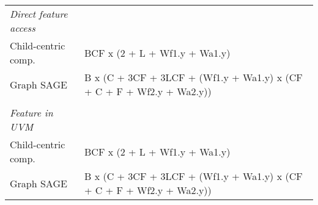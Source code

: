 \documentclass[10pt,oneside]{memoir}
\begin{document}
\begin{longtable}[]{@{}ll@{}}
\begin{minipage}[t]{0.62\columnwidth}\raggedright
\emph{Direct feature access}\strut
\end{minipage} & \begin{minipage}[t]{0.32\columnwidth}\raggedright
\strut
\end{minipage}\tabularnewline
\begin{minipage}[t]{0.62\columnwidth}\raggedright
Child-centric comp.\strut
\end{minipage} & \begin{minipage}[t]{0.32\columnwidth}\raggedright
BCF x (2 + L + Wf1.y + Wa1.y)\strut
\end{minipage}\tabularnewline
\begin{minipage}[t]{0.62\columnwidth}\raggedright
Graph SAGE\strut
\end{minipage} & \begin{minipage}[t]{0.32\columnwidth}\raggedright
B x (C + 3CF + 3LCF + (Wf1.y + Wa1.y) x (CF + C + F + Wf2.y +
Wa2.y))\strut
\end{minipage}\tabularnewline
\begin{minipage}[t]{0.62\columnwidth}\raggedright
\strut
\end{minipage} & \begin{minipage}[t]{0.32\columnwidth}\raggedright
\strut
\end{minipage}\tabularnewline
\begin{minipage}[t]{0.62\columnwidth}\raggedright
\emph{Feature in UVM}\strut
\end{minipage} & \begin{minipage}[t]{0.32\columnwidth}\raggedright
\strut
\end{minipage}\tabularnewline
\begin{minipage}[t]{0.62\columnwidth}\raggedright
Child-centric comp.\strut
\end{minipage} & \begin{minipage}[t]{0.32\columnwidth}\raggedright
BCF x (2 + L + Wf1.y + Wa1.y)\strut
\end{minipage}\tabularnewline
\begin{minipage}[t]{0.62\columnwidth}\raggedright
Graph SAGE\strut
\end{minipage} & \begin{minipage}[t]{0.32\columnwidth}\raggedright
B x (C + 3CF + 3LCF + (Wf1.y + Wa1.y) x (CF + C + F + Wf2.y +
Wa2.y))\strut
\end{minipage}\tabularnewline
\bottomrule
\end{longtable}
\end{document}
